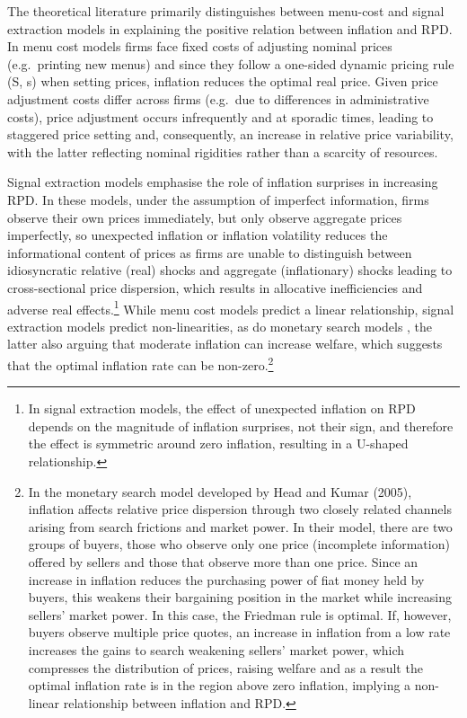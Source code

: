 \documentclass[
  letterpaper,
  DIV=11,
  numbers=noendperiod]{scrartcl}
\begin{document}
The theoretical literature primarily distinguishes between menu-cost and
signal extraction models in explaining the positive relation between
inflation and RPD. In menu cost models
\citep{sheshinki1979, sheshinski1983, rotemberg1983, benabou1992} firms
face fixed costs of adjusting nominal prices (e.g.~printing new menus)
and since they follow a one-sided dynamic pricing rule (S, s) when
setting prices, inflation reduces the optimal real price. Given price
adjustment costs differ across firms (e.g.~due to differences in
administrative costs), price adjustment occurs infrequently and at
sporadic times, leading to staggered price setting and, consequently, an
increase in relative price variability, with the latter reflecting
nominal rigidities rather than a scarcity of resources.

Signal extraction models emphasise the role of inflation surprises in
increasing RPD. In these models, under the assumption of imperfect
information, firms observe their own prices immediately, but only
observe aggregate prices imperfectly, so unexpected inflation or
inflation volatility reduces the informational content of prices as
firms are unable to distinguish between idiosyncratic relative (real)
shocks and aggregate (inflationary) shocks
\citep{lucas1973, hercowitz1981, cukierman1983, barro1976} leading to
cross-sectional price dispersion, which results in allocative
inefficiencies and adverse real effects.\footnote{In signal extraction
  models, the effect of unexpected inflation on RPD depends on the
  magnitude of inflation surprises, not their sign, and therefore the
  effect is symmetric around zero inflation, resulting in a U-shaped
  relationship.} While menu cost models predict a linear relationship,
signal extraction models predict non-linearities, as do monetary search
models \citep{head2005}, the latter also arguing that moderate inflation
can increase welfare, which suggests that the optimal inflation rate can
be non-zero.\footnote{In the monetary search model developed by Head and
  Kumar (2005), inflation affects relative price dispersion through two
  closely related channels arising from search frictions and market
  power. In their model, there are two groups of buyers, those who
  observe only one price (incomplete information) offered by sellers and
  those that observe more than one price. Since an increase in inflation
  reduces the purchasing power of fiat money held by buyers, this
  weakens their bargaining position in the market while increasing
  sellers' market power. In this case, the Friedman rule is optimal. If,
  however, buyers observe multiple price quotes, an increase in
  inflation from a low rate increases the gains to search weakening
  sellers' market power, which compresses the distribution of prices,
  raising welfare and as a result the optimal inflation rate is in the
  region above zero inflation, implying a non-linear relationship
  between inflation and RPD.}
\end{document}
